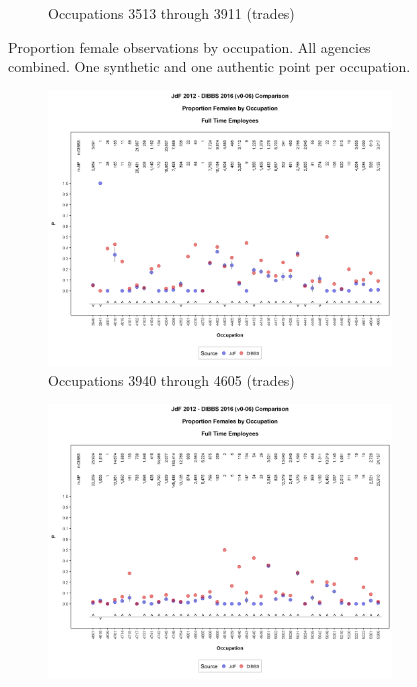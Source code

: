 \documentclass[10pt, letterpaper]{article}
\begin{document}
\begin{spacing}{1.0}
\begin{figure}[h]
\begin{subfigure}{1\textwidth}
        \caption{Occupations 3513 through 3911 (trades)}
        \vspace{10pt}
    \end{subfigure}
    \caption{Proportion female observations by occupation.  All agencies combined.  One synthetic and one authentic point per occupation.}
    \label{figure:JdFDIBBSOccupationProportionBar3}
\end{figure}

\clearpage

\begin{figure}[h]
    \centering
    \begin{subfigure}{1\textwidth}
        \centering
        \includegraphics[width=6in, trim={0 1in 0 1in}, clip]{JdFDIBBSOccupationProportionBar561.png}
        \caption{Occupations 3940 through 4605 (trades)}
        \vspace{10pt}
    \end{subfigure}
    \begin{subfigure}{1\textwidth}
        \centering
        \includegraphics[width=6in, trim={0 1in 0 1in}, clip]{JdFDIBBSOccupationProportionBar601.png}

\end{subfigure}
\end{figure}
\end{spacing}
\end{document}
